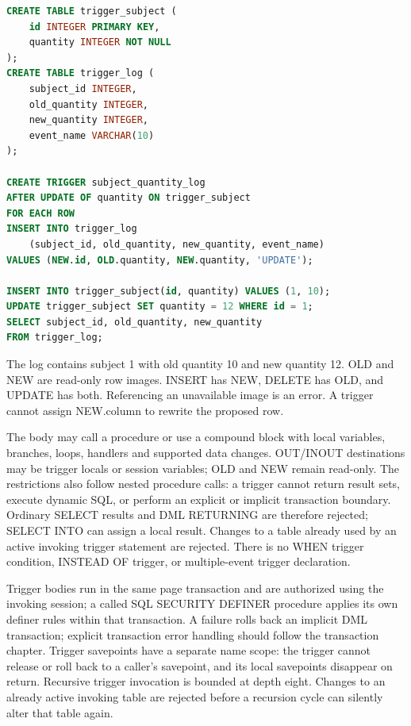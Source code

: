 \begin{lstlisting}[language=SQL]
CREATE TABLE trigger_subject (
    id INTEGER PRIMARY KEY,
    quantity INTEGER NOT NULL
);
CREATE TABLE trigger_log (
    subject_id INTEGER,
    old_quantity INTEGER,
    new_quantity INTEGER,
    event_name VARCHAR(10)
);

CREATE TRIGGER subject_quantity_log
AFTER UPDATE OF quantity ON trigger_subject
FOR EACH ROW
INSERT INTO trigger_log
    (subject_id, old_quantity, new_quantity, event_name)
VALUES (NEW.id, OLD.quantity, NEW.quantity, 'UPDATE');

INSERT INTO trigger_subject(id, quantity) VALUES (1, 10);
UPDATE trigger_subject SET quantity = 12 WHERE id = 1;
SELECT subject_id, old_quantity, new_quantity
FROM trigger_log;
\end{lstlisting}

The log contains subject 1 with old quantity 10 and new quantity 12. OLD and NEW are read-only row images. INSERT has NEW, DELETE has OLD, and UPDATE has both. Referencing an unavailable image is an error. A trigger cannot assign NEW.column to rewrite the proposed row.


The body may call a procedure or use a compound block with local variables,
branches, loops, handlers and supported data changes. OUT/INOUT destinations
may be trigger locals or session variables; OLD and NEW remain read-only.
The restrictions also follow nested procedure calls: a trigger cannot return
result sets, execute dynamic SQL, or perform an explicit or implicit transaction
boundary. Ordinary SELECT results and DML RETURNING are therefore rejected;
SELECT INTO can assign a local result. Changes to a table already used by an
active invoking trigger statement are rejected. There is no WHEN trigger
condition, INSTEAD OF trigger, or multiple-event trigger declaration.

Trigger bodies run in the same page transaction and are authorized using the
invoking session; a called SQL SECURITY DEFINER procedure applies its own
definer rules within that transaction. A failure rolls back an implicit DML
transaction; explicit transaction error handling should follow the transaction
chapter. Trigger savepoints have a separate name scope: the trigger cannot
release or roll back to a caller's savepoint, and its local savepoints disappear
on return. Recursive trigger invocation is bounded at depth eight. Changes to
an already active invoking table are rejected before a recursion cycle can
silently alter that table again.

